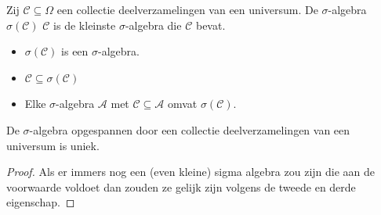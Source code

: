 \documentclass[main.tex]{subfiles}
\begin{document}
\begin{de}
  Zij $\mathcal{C} \subseteq \Omega$ een collectie deelverzamelingen van een universum.
  De $\sigma$-algebra $\sigma(\mathcal{C})$  $\mathcal{C}$ is de kleinste $\sigma$-algebra die $\mathcal{C}$ bevat.

  \begin{itemize}
  \item $\sigma(\mathcal{C})$ is een $\sigma$-algebra.
  \item $\mathcal{C} \subseteq \sigma(\mathcal{C})$
  \item Elke $\sigma$-algebra $\mathcal{A}$ met $\mathcal{C} \subseteq \mathcal{A}$ omvat $\sigma(\mathcal{C})$.
  \end{itemize}
\end{de}

\begin{st}
  De $\sigma$-algebra opgespannen door een collectie deelverzamelingen van een universum is uniek.

  \begin{proof}
    Als er immers nog een (even kleine) sigma algebra zou zijn die aan de voorwaarde voldoet dan zouden ze gelijk zijn volgens de tweede en derde eigenschap.
  \end{proof}
\end{st}
\end{document}
